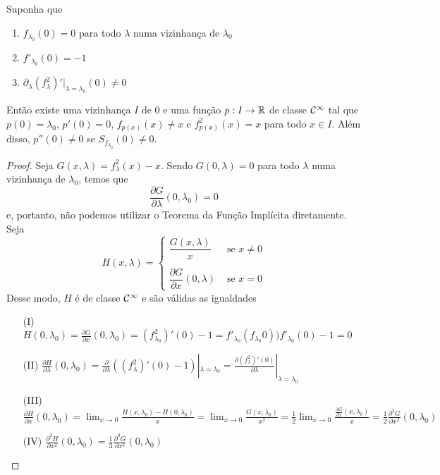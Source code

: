\begin{theorem}
Suponha que
\begin{enumerate}
\item $f_{\lambda_0}(0) = 0$ para todo $\lambda$ numa vizinhança de $\lambda_0$
\item $f'_{\lambda_0}(0) = -1$
\item $\partial_\lambda (f^2_\lambda)' |_{\lambda = \lambda_0}(0) \neq 0$
\end{enumerate}
Então existe uma vizinhança $I$ de $0$ e uma função $p: I \to \mathbb{R}$ de classe $\mathcal{C}^\infty$ tal que $p(0) = \lambda_0$, $p'(0) = 0$,  $f_{p(x)}(x) \neq x$ e  $f^2_{p(x)}(x) = x$ para todo $x \in I$. Além disso, $p''(0) \neq 0$ se $S_{f_{\lambda_0}}(0) \neq 0$.
\end{theorem}

\begin{proof}
Seja $G(x, \lambda) = f^2_\lambda (x) - x$. Sendo $G(0, \lambda) = 0$ para todo $\lambda$ numa vizinhança de $\lambda_0$, temos que
$$\frac{\partial G}{\partial \lambda}(0, \lambda_0) = 0$$
e, portanto, não podemos utilizar o Teorema da Função Implícita diretamente.
Seja
\[ H(x, \lambda) =
    \begin{cases} 
      \dfrac{G(x, \lambda)}{x} & \textrm{ se } x \neq 0 \\
      \\
      \dfrac{\partial G}{\partial x}(0, \lambda) & \textrm{ se } x = 0
   \end{cases}
\]
Desse modo, $H$ é de classe $\mathcal{C}^\infty$ e são válidas as igualdades
\begin{enumerate}
\item[(I)]
$H(0, \lambda_0) = \frac{\partial G}{\partial x}(0, \lambda_0) = (f^2_{\lambda_0})'(0) - 1 = f'_{\lambda_0}(f_{\lambda_0}0)) f'_{\lambda_0}(0) - 1 = 0 $

\item[(II)]
$\frac{\partial H}{\partial \lambda}(0, \lambda_0) =\frac{\partial}{\partial \lambda}((f^2_\lambda)'(0) - 1)|_{\lambda = \lambda_0} = \frac{\partial (f^2_\lambda)'(0)}{\partial \lambda}|_{\lambda = \lambda_0}$
 
\item[(III)]
$ \frac{\partial H}{\partial x}(0, \lambda_0) = \lim_{x \to 0} \frac{H(x, \lambda_0) - H(0, \lambda_0)}{x}
= \lim_{x \to 0} \frac{G(x, \lambda_0)}{x^2}
= \frac{1}{2} \lim_{x \to 0} \frac{\frac{\partial G}{\partial x}(x, \lambda_0)}{x} = \frac{1}{2}\frac{\partial^2 G}{\partial x^2}(0, \lambda_0) $
\item[(IV)]
$\frac{\partial^2 H}{\partial x^2}(0, \lambda_0) = \frac{1}{3} \frac{\partial^3 G}{\partial x^3}(0, \lambda_0)$
\end{enumerate}


\end{proof}
